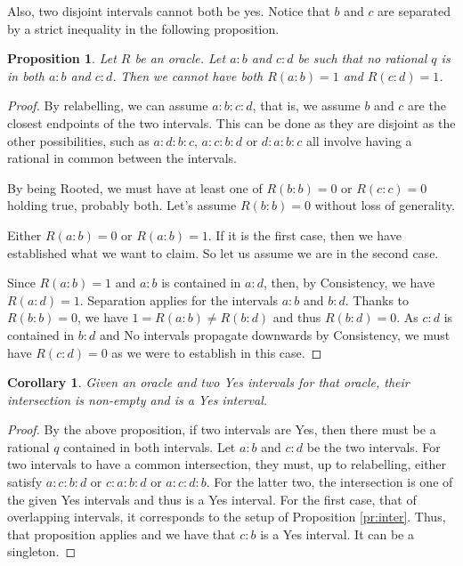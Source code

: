 \documentclass[12pt]{article}
\newtheorem{corollary}{Corollary}[subsection]
\newtheorem{proposition}{Proposition}[subsection]
\begin{document}
Also, two disjoint intervals cannot both be yes. Notice that $b$ and $c$ are separated by a strict inequality in the following proposition. 

\begin{proposition} \label{pr:disjoint}
Let $R$ be an oracle. Let $a:b$ and $c:d$ be such that no rational $q$ is in both $a:b$ and $c:d$. Then we cannot have both $R(a:b) = 1$ and $R(c:d) = 1$. 
\end{proposition}

\begin{proof}
By relabelling, we can assume $a:b:c:d$, that is, we assume $b$ and $c$ are the closest endpoints of the two intervals. This can be done as they are disjoint as the other possibilities, such as $a:d:b:c$, $a:c:b:d$ or $d:a:b:c$ all involve having a rational in common between the intervals.  

By being Rooted, we must have at least one of $R(b:b) = 0$ or $R(c:c) = 0$ holding true, probably both. Let's assume $R(b:b) = 0$ without loss of generality.
 
Either $R(a:b) = 0$ or $R(a:b)=1$. If it is the first case, then we have established what we want to claim. So let us assume we are in the second case. 

Since $R(a:b) = 1$ and $a:b$ is contained in $a:d$, then, by Consistency, we have $R(a:d) = 1$. Separation applies for the intervals $a:b$ and $b:d$. Thanks to $R(b:b) = 0$, we have $1 = R(a:b) \neq R(b:d)$ and thus $R(b:d) = 0$. As $c:d$ is contained in $b:d$ and No intervals propagate downwards by Consistency, we must have $R(c:d)=0$  as we were to establish in this case. 
\end{proof}

\begin{corollary}\label{cor:pair-inter}
    Given an oracle and two Yes intervals for that oracle, their intersection is non-empty and is a Yes interval. 
\end{corollary}

\begin{proof}
    By the above proposition, if two intervals are Yes, then there must be a rational $q$ contained in both intervals. Let $a:b$ and $c:d$ be the two intervals. For two intervals to have a common intersection, they must, up to relabelling,  either satisfy $a:c:b:d$ or $c:a:b:d$ or $a:c:d:b$. For the latter two, the intersection is one of the given Yes intervals and thus is a Yes interval. For the first case, that of overlapping intervals, it corresponds to the setup of Proposition \ref{pr:inter}. Thus, that proposition applies and we have that $c:b$ is a Yes interval. It can be a singleton. 
\end{proof}
\end{document}

